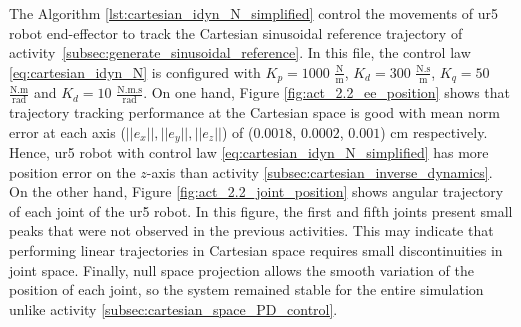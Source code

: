 The Algorithm \ref{lst:cartesian_idyn_N_simplified} control the movements of ur5 robot end-effector to track the Cartesian sinusoidal reference trajectory of activity~\ref{subsec:generate_sinusoidal_reference}. In this file, the control law \eqref{eq:cartesian_idyn_N} is configured with ${K_{p}}=1000$ $\mathrm{\frac{N}{m}}$, $K_{d}= 300$ $\mathrm{\frac{N.s}{m}}$, ${K_{q}}=50$ $\mathrm{\frac{N.m}{rad}}$ and $K_{d}= 10$ $\mathrm{\frac{N.m.s}{rad}}$. On one hand, Figure \ref{fig:act_2.2_ee_position} shows that trajectory tracking performance at the Cartesian space is good with mean norm error at each axis ($||e_x||, ||e_y||, ||e_z||$) of ($0.0018$, $0.0002$, $0.001$) cm respectively. Hence, ur5 robot with control law \ref{eq:cartesian_idyn_N_simplified} has more position error on the $z$-axis than activity \ref{subsec:cartesian_inverse_dynamics}. On the other hand, Figure \ref{fig:act_2.2_joint_position} shows angular trajectory of each joint of the ur5 robot. In this figure, the first and fifth joints present small peaks that were not observed in the previous activities. This may indicate that performing linear trajectories in Cartesian space requires small discontinuities in joint space. Finally, null space projection allows the smooth variation of the position of each joint, so the system remained stable for the entire simulation unlike activity \ref{subsec:cartesian_space_PD_control}. \vspace{.5cm}

